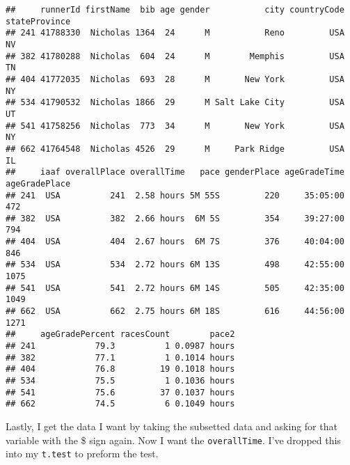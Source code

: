 \documentclass[
]{article}
\newenvironment{Shaded}{\begin{snugshade}}{\end{snugshade}}
\newcommand{\FunctionTok}[1]{\textcolor[rgb]{0.13,0.29,0.53}{\textbf{#1}}}
\newcommand{\NormalTok}[1]{#1}
\newcommand{\OtherTok}[1]{\textcolor[rgb]{0.56,0.35,0.01}{#1}}
\newcommand{\SpecialCharTok}[1]{\textcolor[rgb]{0.81,0.36,0.00}{\textbf{#1}}}
\newcommand{\StringTok}[1]{\textcolor[rgb]{0.31,0.60,0.02}{#1}}
\begin{document}
\begin{verbatim}
##     runnerId firstName  bib age gender           city countryCode stateProvince
## 241 41788330  Nicholas 1364  24      M           Reno         USA            NV
## 382 41780288  Nicholas  604  24      M        Memphis         USA            TN
## 404 41772035  Nicholas  693  28      M       New York         USA            NY
## 534 41790532  Nicholas 1866  29      M Salt Lake City         USA            UT
## 541 41758256  Nicholas  773  34      M       New York         USA            NY
## 662 41764548  Nicholas 4526  29      M     Park Ridge         USA            IL
##     iaaf overallPlace overallTime   pace genderPlace ageGradeTime ageGradePlace
## 241  USA          241  2.58 hours 5M 55S         220     35:05:00           472
## 382  USA          382  2.66 hours  6M 5S         354     39:27:00           794
## 404  USA          404  2.67 hours  6M 7S         376     40:04:00           846
## 534  USA          534  2.72 hours 6M 13S         498     42:55:00          1075
## 541  USA          541  2.72 hours 6M 14S         505     42:35:00          1049
## 662  USA          662  2.75 hours 6M 18S         616     44:56:00          1271
##     ageGradePercent racesCount        pace2
## 241            79.3          1 0.0987 hours
## 382            77.1          1 0.1014 hours
## 404            76.8         19 0.1018 hours
## 534            75.5          1 0.1036 hours
## 541            75.6         37 0.1037 hours
## 662            74.5          6 0.1049 hours
\end{verbatim}

Lastly, I get the data I want by taking the subsetted data and asking
for that variable with the \$ sign again. Now I want the
\texttt{overallTime}. I've dropped this into my \texttt{t.test} to
preform the test.

\begin{Shaded}
\end{Shaded}
\end{document}
